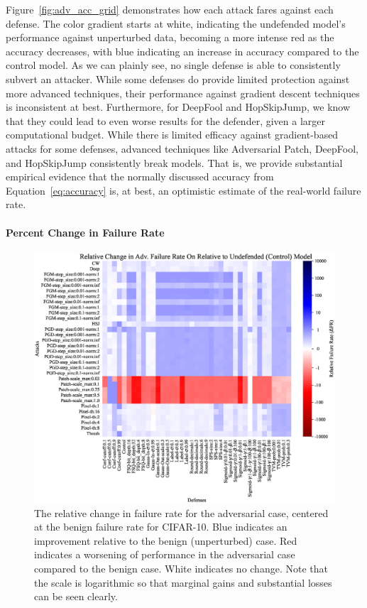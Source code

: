 \documentclass[journal]{IEEEtran}
\begin{document}
Figure~\ref{fig:adv_acc_grid} demonstrates how each attack fares against each defense. The color gradient starts at white, indicating the undefended model's performance against unperturbed data, becoming a more intense red as the accuracy decreases, with blue indicating an increase in accuracy compared to the control model. As we can plainly see, no single defense is able to consistently subvert an attacker.  While some defenses do provide limited protection against more advanced techniques, their performance against gradient descent techniques is inconsistent at best. Furthermore, for DeepFool and HopSkipJump, we know that they could lead to even worse results for the defender, given a larger computational budget. While there is limited efficacy against gradient-based attacks for some defenses, advanced techniques like Adversarial Patch, DeepFool, and HopSkipJump consistently break models. That is, we provide substantial empirical evidence that the normally discussed accuracy from Equation~\ref{eq:accuracy} is, at best, an optimistic estimate of the real-world failure rate.



\paragraph{Percent Change in Failure Rate}
\begin{figure}[!hptb]
    {\centering
    \includegraphics[trim={0 0.85em 0 0.35em},clip,height=0.6\textwidth]{Fig16.eps}
    \vspace{-0.75em}
    \caption{The relative change in failure rate for the adversarial case, centered at the benign failure rate for CIFAR-10. Blue indicates an improvement relative to the benign (unperturbed) case. Red indicates a worsening of performance in the adversarial case compared to the benign case. White indicates no change. Note that the scale is logarithmic so that marginal gains and substantial losses can be seen clearly.}
    \label{fig:change_grid}
    } %
\end{figure}
\end{document}
